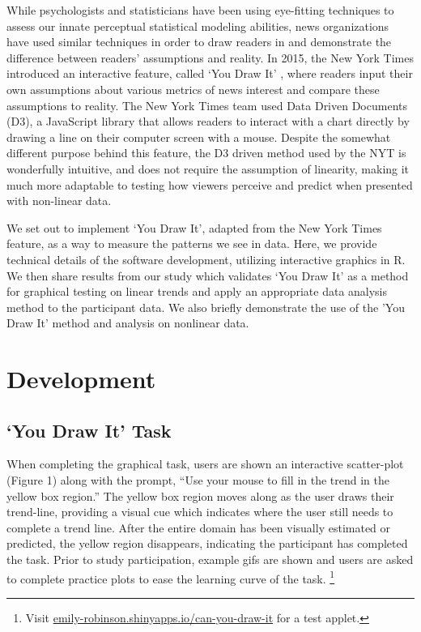 \documentclass[10pt]{article}
\begin{document}
{\textcolor{RedOrange}{While psychologists and statisticians have been using eye-fitting techniques to assess our innate perceptual statistical modeling abilities, news organizations have used similar techniques in order to draw readers in and demonstrate the difference between readers' assumptions and reality.}}
In 2015, the New York Times introduced an interactive feature, called
`You Draw It' \cite{aisch2015you}, where readers input their own
assumptions about various
{\textcolor{RedOrange}{metrics of news interest}} and compare these
assumptions to reality. The New York Times team used Data Driven
Documents (D3), {\textcolor{RedOrange}{a JavaScript library}} that
allows readers to
{\textcolor{RedOrange}{interact with a chart directly by}} drawing a
line on their computer screen with a mouse.
{\textcolor{RedOrange}{Despite the somewhat different purpose behind this feature, the D3 driven method used by the NYT is wonderfully intuitive, and does not require the assumption of linearity, making it much more adaptable to testing how viewers perceive and predict when presented with non-linear data.}}

{\textcolor{RedOrange}{We set out to implement}} `You Draw It', adapted
from the New York Times feature, as a way to measure the patterns we see
in data. Here, we provide technical details of the software development,
utilizing interactive graphics in R\cite{r-software}. We then share
results from our study which validates `You Draw It' as a method for
graphical testing {\textcolor{RedOrange}{on linear trends}} and apply an
appropriate data analysis method to the participant data.
{\textcolor{RedOrange}{We also briefly demonstrate the use of the 'You Draw It' method and analysis on nonlinear data.}}

\section{Development}

\subsection{`You Draw It' Task}

When completing the graphical task, users are shown an interactive
scatter-plot (Figure 1) along with the prompt, ``Use your mouse to fill
in the trend in the yellow box region.'' The yellow box region moves
along as the user draws their trend-line, providing a visual cue which
indicates where the user still needs to complete a trend line. After the
entire domain has been visually estimated or predicted, the yellow
region disappears, indicating the participant has completed the task.
Prior to study participation, example gifs are shown and users are asked
to complete practice plots to ease the learning curve of the task.
\footnote{Visit \url{emily-robinson.shinyapps.io/can-you-draw-it} for a
  test applet.}
\end{document}
